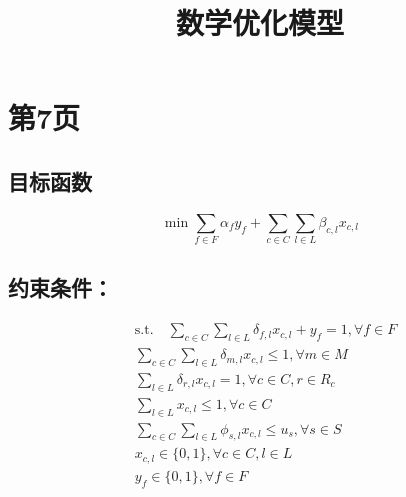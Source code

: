 \documentclass{article}
\title{数学优化模型}
\author{}
\date{}
\begin{document}
\maketitle

\section{第7页}

\subsection{目标函数}
\begin{equation}
\min \sum_{f\in F}\alpha_f y_f + \sum_{c\in C}\sum_{l\in L}\beta_{c,l}x_{c,l} \tag{1}
\end{equation}

\subsection{约束条件：}
\begin{align}
& \text{s.t.} \quad \sum_{c\in C}\sum_{l\in L}\delta_{f,l}x_{c,l} + y_f = 1, \forall f \in F \tag{2} \\
& \sum_{c\in C}\sum_{l\in L}\delta_{m,l}x_{c,l} \leq 1, \forall m \in M \tag{3} \\
& \sum_{l\in L}\delta_{r,l}x_{c,l} = 1, \forall c \in C, r \in R_c \tag{4} \\
& \sum_{l\in L}x_{c,l} \leq 1, \forall c \in C \tag{5} \\
& \sum_{c\in C}\sum_{l\in L}\phi_{s,l}x_{c,l} \leq u_s, \forall s \in S \tag{6} \\
& x_{c,l} \in \{0, 1\}, \forall c \in C, l \in L \tag{7} \\
& y_f \in \{0, 1\}, \forall f \in F \tag{8}
\end{align}
\end{document}
